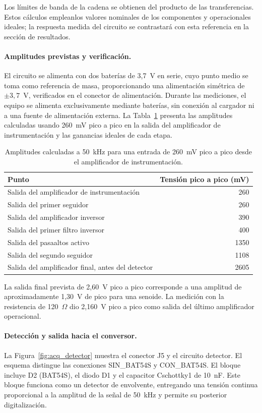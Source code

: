 \documentclass[12pt,a4paper]{article}
\begin{document}
Los límites de banda de la cadena se obtienen del producto de las transferencias. 
Estos cálculos empleanlos valores nominales de los componentes y operacionales ideales; la respuesta medida
del circuito se contrastará con esta referencia en la sección de resultados.

\paragraph{Amplitudes previstas y verificación.}
El circuito se alimenta con dos baterías de 3,7~V en serie, cuyo punto medio se toma como referencia de masa,
proporcionando una alimentación simétrica de $\pm3{,}7$~V, verificados en el conector de alimentación.
Durante las mediciones, el equipo se alimenta exclusivamente mediante baterías, sin conexión al cargador
ni a una fuente de alimentación externa.
La Tabla~\ref{tab:amplitudes_propuestas} presenta las amplitudes calculadas usando 260~mV pico a pico
en la salida del amplificador de instrumentación y las ganancias ideales de cada etapa.
\begin{table}[htbp]
    \centering
    \caption{Amplitudes calculadas a 50~kHz para una entrada de 260~mV pico a pico desde el amplificador de instrumentación.}
    \label{tab:amplitudes_propuestas}
    \begin{tabular}{lr}
        \hline
        Punto & Tensión pico a pico (mV) \\
        \hline
        Salida del amplificador de instrumentación & 260 \\
        Salida del primer seguidor & 260 \\
        Salida del amplificador inversor & 390 \\
        Salida del primer filtro inversor & 400 \\
        Salida del pasaaltos activo & 1350 \\
        Salida del segundo seguidor & 1108 \\
        Salida del amplificador final, antes del detector & 2605 \\
        \hline
    \end{tabular}
\end{table}
La salida final prevista de 2,60~V pico a pico corresponde a una amplitud de aproximadamente
1,30~V de pico para una senoide. La medición con la resistencia de 120~$\Omega$ dio 2,160~V
pico a pico como salida del último amplificador operacional.

\paragraph{Detección y salida hacia el conversor.}
La Figura~\ref{fig:acq_detector} muestra el conector J5 y el circuito detector.
El esquema distingue las conexiones SIN\_BAT54S y CON\_BAT54S. El bloque incluye
D2 (BAT54S), el diodo D1 y el capacitor Cschottky1 de 10~nF.
Este bloque funciona como un detector de envolvente, entregando una tensión continua proporcional a la amplitud de la señal de 50~kHz
y permite su posterior digitalización. 
\end{document}

